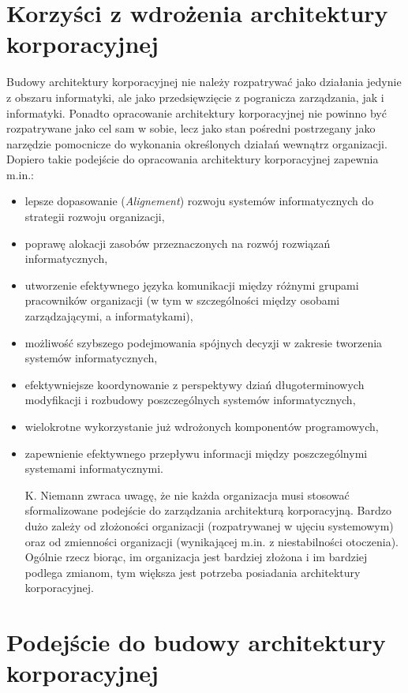 \section{Korzyści z wdrożenia architektury korporacyjnej}
Budowy architektury korporacyjnej nie należy rozpatrywać jako działania jedynie z obszaru informatyki, ale jako przedsięwzięcie z pogranicza zarządzania, jak i informatyki. Ponadto opracowanie architektury korporacyjnej nie powinno być rozpatrywane jako cel sam w sobie, lecz jako stan pośredni postrzegany jako narzędzie pomocnicze do wykonania określonych działań wewnątrz organizacji. Dopiero takie podejście do opracowania architektury korporacyjnej zapewnia m.in.:
\begin{itemize}
\item{lepsze dopasowanie (\textit{Alignement}) rozwoju systemów informatycznych do strategii rozwoju organizacji,}
\item{poprawę alokacji zasobów przeznaczonych na rozwój rozwiązań informatycznych,}
\item{utworzenie efektywnego języka komunikacji między różnymi grupami pracowników organizacji (w tym w szczególności między osobami zarządzającymi, a informatykami),}
\item{możliwość szybszego podejmowania spójnych decyzji w zakresie tworzenia systemów informatycznych,}
\item{efektywniejsze koordynowanie z perspektywy dziań długoterminowych modyfikacji i rozbudowy poszczególnych systemów informatycznych,}
\item{wielokrotne wykorzystanie już wdrożonych komponentów programowych,}
\item{zapewnienie efektywnego przepływu informacji między poszczególnymi systemami informatycznymi.}

K. Niemann zwraca uwagę, że nie każda organizacja musi stosować sformalizowane podejście do zarządzania architekturą korporacyjną. Bardzo dużo zależy od złożoności organizacji (rozpatrywanej w ujęciu systemowym) oraz od zmienności organizacji (wynikającej m.in. z niestabilności otoczenia). Ogólnie rzecz biorąc, im organizacja jest bardziej złożona i im bardziej podlega zmianom, tym większa jest potrzeba posiadania architektury korporacyjnej.
\end{itemize}

\section{Podejście do budowy architektury korporacyjnej}
